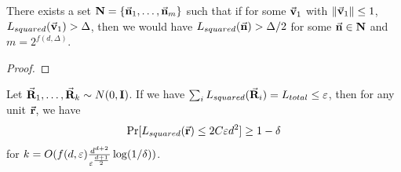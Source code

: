 \begin{proposition}
    There exists a set ${\mathbf{N}} =\{\vec{{\mathbf{n}}}_1,\dots,\vec{{\mathbf{n}}}_m\}$ such that if for some $\vec{{\mathbf{v}}}_1$ with $\|\vec{{\mathbf{v}}}_1\| \leq 1$, $L_{squared}(\vec{{\mathbf{v}}}_1) > \Delta$, then we would have $L_{squared}(\vec{{\mathbf{n}}}) > \Delta/2$ for some $\vec{{\mathbf{n}}} \in {\ensuremath{\mathbf{N}}}$ and $m = 2^{f(d,\Delta)}$.
\end{proposition}
\begin{proof}
\end{proof}

\begin{theorem}
    Let $\vec{{\mathbf{R}}}_1,\dots, \vec{{\mathbf{R}}}_k \sim N(0, \mathbf{I})$. If we have $\sum_{i}L_{squared}(\vec{{\mathbf{R}}}_i) = L_{total} \leq {\varepsilon}$, then for any unit $\vec{{\mathbf{r}}}$, we have
    \[
        \Pr[L_{squared}(\vec{{\mathbf{r}}}) \leq 2C{\varepsilon} d^2] \geq 1-\delta
    \]
    for $k = O(f(d,{\varepsilon}) \frac{d^{d+2}}{{\varepsilon}^{\frac{d+1}{2}}}\log(1/\delta))$.
\end{theorem}
\fi